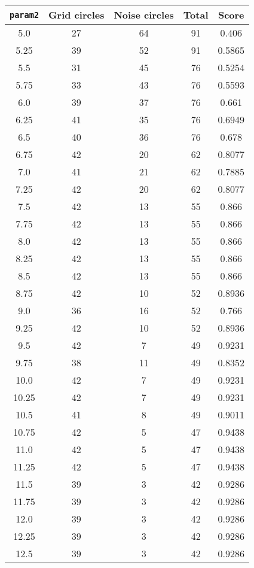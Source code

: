 \documentclass[letterpaper, 12pt]{article}
\begin{document}
\begin{longtable}{|c|c|c|c|c|}
\hline
\textbf{\texttt{param2}} & \textbf{Grid circles} & \textbf{Noise circles} & \textbf{Total} & \textbf{Score} \\
\hline
5.0 & 27 & 64 & 91 & 0.406 \\
\hline
5.25 & 39 & 52 & 91 & 0.5865 \\
\hline
5.5 & 31 & 45 & 76 & 0.5254 \\
\hline
5.75 & 33 & 43 & 76 & 0.5593 \\
\hline
6.0 & 39 & 37 & 76 & 0.661 \\
\hline
6.25 & 41 & 35 & 76 & 0.6949 \\
\hline
6.5 & 40 & 36 & 76 & 0.678 \\
\hline
6.75 & 42 & 20 & 62 & 0.8077 \\
\hline
7.0 & 41 & 21 & 62 & 0.7885 \\
\hline
7.25 & 42 & 20 & 62 & 0.8077 \\
\hline
7.5 & 42 & 13 & 55 & 0.866 \\
\hline
7.75 & 42 & 13 & 55 & 0.866 \\
\hline
8.0 & 42 & 13 & 55 & 0.866 \\
\hline
8.25 & 42 & 13 & 55 & 0.866 \\
\hline
8.5 & 42 & 13 & 55 & 0.866 \\
\hline
8.75 & 42 & 10 & 52 & 0.8936 \\
\hline
9.0 & 36 & 16 & 52 & 0.766 \\
\hline
9.25 & 42 & 10 & 52 & 0.8936 \\
\hline
9.5 & 42 & 7 & 49 & 0.9231 \\
\hline
9.75 & 38 & 11 & 49 & 0.8352 \\
\hline
10.0 & 42 & 7 & 49 & 0.9231 \\
\hline
10.25 & 42 & 7 & 49 & 0.9231 \\
\hline
10.5 & 41 & 8 & 49 & 0.9011 \\
\hline
10.75 & 42 & 5 & 47 & 0.9438 \\
\hline
11.0 & 42 & 5 & 47 & 0.9438 \\
\hline
11.25 & 42 & 5 & 47 & 0.9438 \\
\hline
11.5 & 39 & 3 & 42 & 0.9286 \\
\hline
11.75 & 39 & 3 & 42 & 0.9286 \\
\hline
12.0 & 39 & 3 & 42 & 0.9286 \\
\hline
12.25 & 39 & 3 & 42 & 0.9286 \\
\hline
12.5 & 39 & 3 & 42 & 0.9286 \\

\end{longtable}
\end{document}
